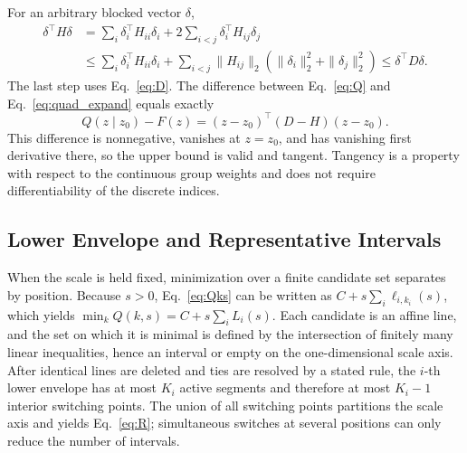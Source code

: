 For an arbitrary blocked vector $\delta$,
\begin{equation}
\begin{aligned}
\delta^\top H\delta
&=\sum_i\delta_i^\top H_{ii}\delta_i+
2\sum_{i<j}\delta_i^\top H_{ij}\delta_j \\
&\le\sum_i\delta_i^\top H_{ii}\delta_i+
\sum_{i<j}\|H_{ij}\|_2(\|\delta_i\|_2^2+\|\delta_j\|_2^2)
\le\delta^\top D\delta.
\end{aligned}
\end{equation}
The last step uses Eq.~\eqref{eq:D}.
The difference between Eq.~\eqref{eq:Q} and Eq.~\eqref{eq:quad_expand} equals exactly
\begin{equation}
Q(z\mid z_0)-F(z)=(z-z_0)^\top(D-H)(z-z_0).
\label{eq:gap}
\end{equation}
This difference is nonnegative, vanishes at $z=z_0$, and has vanishing first derivative there, so the upper bound is valid and tangent.
Tangency is a property with respect to the continuous group weights and does not require differentiability of the discrete indices.

\subsection{Lower Envelope and Representative Intervals}

When the scale is held fixed, minimization over a finite candidate set separates by position.
Because $s>0$, Eq.~\eqref{eq:Qks} can be written as $C+s\sum_i\ell_{i,k_i}(s)$, which yields $\min_k Q(k,s)=C+s\sum_iL_i(s)$.
Each candidate is an affine line, and the set on which it is minimal is defined by the intersection of finitely many linear inequalities, hence an interval or empty on the one-dimensional scale axis.
After identical lines are deleted and ties are resolved by a stated rule, the $i$-th lower envelope has at most $K_i$ active segments and therefore at most $K_i-1$ interior switching points.
The union of all switching points partitions the scale axis and yields Eq.~\eqref{eq:R}; simultaneous switches at several positions can only reduce the number of intervals.

